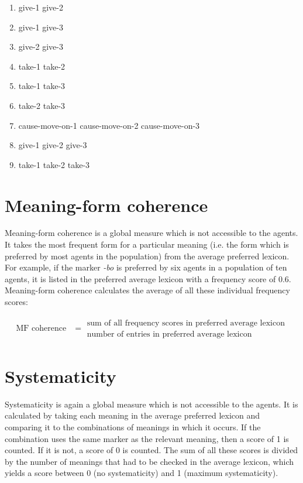 \begin{multicols}{2}
\begin{enumerate}
\item give-1 give-2
\item give-1 give-3
\item give-2 give-3
\item take-1 take-2
\item take-1 take-3
\item take-2 take-3
\item cause-move-on-1 cause-move-on-2 cause-move-on-3
\item give-1 give-2 give-3
\item take-1 take-2 take-3
\end{enumerate}
\end{multicols}

\section*{Meaning-form coherence}

Meaning-form coherence is a global measure which is not accessible to the agents. It takes the most frequent form for a particular meaning (i.e. the form which is preferred by most agents in the population) from the average preferred lexicon. For example, if the marker {\em -bo} is preferred by six agents in a population of ten agents, it is listed in the preferred average lexicon with a frequency score of 0.6. Meaning-form coherence calculates the average of all these individual frequency scores:

\begin{align*}
\text{MF coherence} &= \begin{array}{cc}
\text{sum of all frequency scores in preferred average lexicon} \\ \hline
\text{number of entries in preferred average lexicon}
\end{array}
\end{align*}

\section*{Systematicity}

Systematicity is again a global measure which is not accessible to the agents. It is calculated by taking each meaning in the average preferred lexicon and comparing it to the combinations of meanings in which it occurs. If the combination uses the same marker as the relevant meaning, then a score of 1 is counted. If it is not, a score of 0 is counted. The sum of all these scores is divided by the number of meanings that had to be checked in the average lexicon, which yields a score between 0 (no systematicity) and 1 (maximum systematicity).

